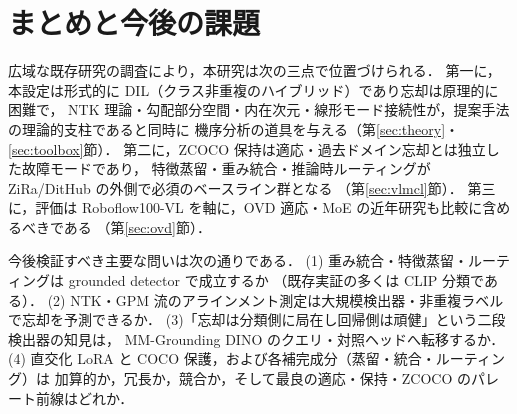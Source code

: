 \documentclass[11pt, a4j]{jarticle}
\begin{document}
\section{まとめと今後の課題}
\label{sec:conclusion}
広域な既存研究の調査により，本研究は次の三点で位置づけられる．
第一に，本設定は形式的に DIL（クラス非重複のハイブリッド）であり忘却は原理的に困難で，
NTK 理論・勾配部分空間・内在次元・線形モード接続性が，提案手法の理論的支柱であると同時に
機序分析の道具を与える（第\ref{sec:theory}・\ref{sec:toolbox}節）．
第二に，ZCOCO 保持は適応・過去ドメイン忘却とは独立した故障モードであり，
特徴蒸留・重み統合・推論時ルーティングが ZiRa/DitHub の外側で必須のベースライン群となる
（第\ref{sec:vlmcl}節）．
第三に，評価は Roboflow100-VL を軸に，OVD 適応・MoE の近年研究も比較に含めるべきである
（第\ref{sec:ovd}節）．

今後検証すべき主要な問いは次の通りである．
(1) 重み統合・特徴蒸留・ルーティングは grounded detector で成立するか
（既存実証の多くは CLIP 分類である）．
(2) NTK・GPM 流のアラインメント測定は大規模検出器・非重複ラベルで忘却を予測できるか．
(3)「忘却は分類側に局在し回帰側は頑健」という二段検出器の知見は，
MM-Grounding DINO のクエリ・対照ヘッドへ転移するか．
(4) 直交化 LoRA と COCO 保護，および各補完成分（蒸留・統合・ルーティング）は
加算的か，冗長か，競合か，そして最良の適応・保持・ZCOCO のパレート前線はどれか．



\end{document}
